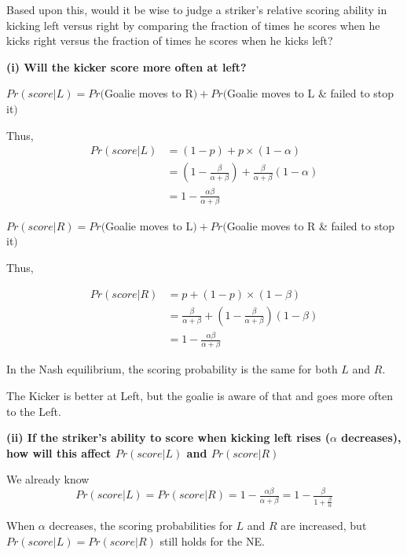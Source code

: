 \documentclass{article}
\begin{document}
 Based upon this, would it be wise to judge a striker's relative scoring ability in kicking left versus right by comparing the fraction of times he scores when he kicks right versus the fraction of times he scores when he kicks left?

\medskip

\textbf{(i) Will the kicker score more often at left?}

\medskip

$Pr(score|L) = Pr($Goalie moves to R$) + Pr($Goalie moves to L \&  failed to stop it$)$

\medskip

Thus, 
\begin{align*}
Pr(score|L) &= (1-p) + p \times (1-\alpha) \\
&= (1-\tfrac{\beta}{\alpha + \beta}) + \tfrac{\beta}{\alpha + \beta} (1-\alpha) \\
&= 1- \tfrac{\alpha \beta }{\alpha + \beta} 
\end{align*}


$Pr(score|R) = Pr($Goalie moves to L$) + Pr($Goalie moves to R \&  failed to stop it$)$

\medskip

Thus, 

\begin{align*}
Pr(score|R) &= p + (1-p)\times (1-\beta)  \\
&= \tfrac{\beta}{\alpha + \beta} + (1-\tfrac{\beta}{\alpha + \beta}) (1-\beta) \\
&=  1- \tfrac{\alpha \beta }{\alpha + \beta}
\end{align*}

In the Nash equilibrium, the scoring probability is the same for both $L$ and $R$.


\begin{mdframed}[backgroundcolor=blue!20,linecolor=white]
The Kicker is better at Left, but the goalie is aware of that and goes more often to the Left.

\end{mdframed}


\textbf{(ii) If the striker's ability to score when kicking left rises ($\alpha$ decreases), how will this affect $Pr(score|L)$ and $Pr(score|R)$}

\medskip

We already know $$Pr(score|L) = Pr(score|R)= 1- \tfrac{\alpha \beta }{\alpha + \beta} =  1- \tfrac{\beta }{1 + \frac{\beta}{\alpha}}$$

When $\alpha$ decreases, the scoring probabilities for $L$ and $R$ are increased, but $Pr(score|L) = Pr(score|R)$ still holds for the NE.
\end{document}
